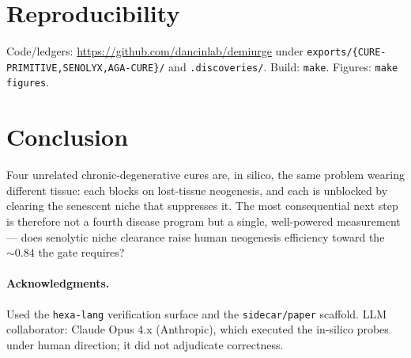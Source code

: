 \documentclass[11pt,a4paper]{article}
\begin{document}
\section{Reproducibility}
\label{sec:repro}
Code/ledgers: \url{https://github.com/dancinlab/demiurge} under
\texttt{exports/\{CURE-PRIMITIVE,SENOLYX,AGA-CURE\}/} and \texttt{.discoveries/}. Build:
\texttt{make}. Figures: \texttt{make figures}.

\section{Conclusion}
\label{sec:conclusion}
Four unrelated chronic-degenerative cures are, in silico, the same problem wearing different
tissue: each blocks on lost-tissue neogenesis, and each is unblocked by clearing the
senescent niche that suppresses it. The most consequential next step is therefore not a
fourth disease program but a single, well-powered measurement --- does senolytic niche
clearance raise human neogenesis efficiency toward the $\sim 0.84$ the gate requires?

\paragraph{Acknowledgments.}
Used the \texttt{hexa-lang} verification surface and the \texttt{sidecar/paper} scaffold.
LLM collaborator: Claude Opus 4.x (Anthropic), which executed the in-silico probes under
human direction; it did not adjudicate correctness.

\appendix
\end{document}
